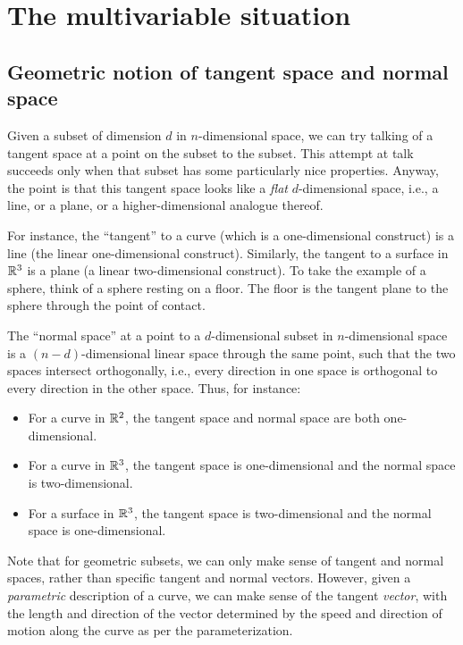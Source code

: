 \documentclass[10pt]{amsart}
\begin{document}
\section{The multivariable situation}

\subsection{Geometric notion of tangent space and normal space}

Given a subset of dimension $d$ in $n$-dimensional space, we can try
talking of a tangent space at a point on the subset to the
subset. This attempt at talk succeeds only when that subset has some
particularly nice properties. Anyway, the point is that this tangent
space looks like a {\em flat} $d$-dimensional space, i.e., a line, or
a plane, or a higher-dimensional analogue thereof.

For instance, the ``tangent'' to a curve (which is a one-dimensional
construct) is a line (the linear one-dimensional
construct). Similarly, the tangent to a surface in $\mathbb{R}^3$ is a plane
(a linear two-dimensional construct). To take the example of a sphere,
think of a sphere resting on a floor. The floor is the tangent plane
to the sphere through the point of contact.

The ``normal space'' at a point to a $d$-dimensional subset in
$n$-dimensional space is a $(n - d)$-dimensional linear space through
the same point, such that the two spaces intersect orthogonally, i.e.,
every direction in one space is orthogonal to every direction in the
other space. Thus, for instance:

\begin{itemize}
\item For a curve in $\mathbb{R}^2$, the tangent space and normal space are
  both one-dimensional.
\item For a curve in $\mathbb{R}^3$, the tangent space is one-dimensional and
  the normal space is two-dimensional.
\item For a surface in $\mathbb{R}^3$, the tangent space is two-dimensional
  and the normal space is one-dimensional.
\end{itemize}

Note that for geometric subsets, we can only make sense of tangent and
normal spaces, rather than specific tangent and normal
vectors. However, given a {\em parametric} description of a curve, we
can make sense of the tangent {\em vector}, with the length and
direction of the vector determined by the speed and direction of
motion along the curve as per the parameterization.
\end{document}

